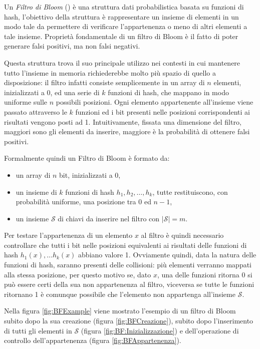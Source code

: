 \documentclass[../../main.tex]{subfiles}
\begin{document}
Un \textit{Filtro di Bloom} (\cite{Bloom1970SpacetimeTI}) è una struttura dati probabilistica basata su funzioni di hash, l'obiettivo della struttura è rappresentare un insieme di elementi in un modo tale da permettere di verificare l'appartenenza o meno di altri elementi a tale insieme. Proprietà fondamentale di un filtro di Bloom è il fatto di poter generare falsi positivi, ma non falsi negativi.

Questa struttura trova il suo principale utilizzo nei contesti in cui mantenere tutto l'insieme in memoria richiederebbe molto più spazio di quello a disposizione: il filtro infatti consiste semplicemente in un array di $n$ elementi, inizializzati a $0$, ed una serie di $k$ funzioni di hash, che mappano in modo uniforme sulle $n$ possibili posizioni. Ogni elemento appartenente all'insieme viene passato attraverso le $k$ funzioni ed i bit presenti nelle posizioni corrispondenti ai risultati vengono posti ad 1. Intuitivamente, fissata una dimensione del filtro, maggiori sono gli elementi da inserire, maggiore è la probabilità di ottenere falsi positivi.

Formalmente quindi un Filtro di Bloom è formato da:
    \begin{itemize}
        \item un array di $n$ bit, inizializzati a 0,
        \item un insieme di $k$ funzioni di hash $h_1, h_2, \dots, h_k$, tutte restituiscono, con probabilità uniforme, una posizione tra $0$ ed $n-1$,
        \item un insieme $\mathcal{S}$ di chiavi da inserire nel filtro con $|\mathcal{S}| = m$.
    \end{itemize}
Per testare l'appartenenza di un elemento $x$ al filtro è quindi necessario controllare che tutti i bit nelle posizioni equivalenti ai risultati delle funzioni di hash $h_1(x), \dots h_k(x)$ abbiano valore 1. Ovviamente quindi, data la natura delle funzioni di hash, saranno presenti delle collisioni: più elementi verranno mappati alla stessa posizione, per questo motivo se, dato $x$, una delle funzioni ritorna 0 si può essere certi della sua non appartenenza al filtro, viceversa se tutte le funzioni ritornano 1 è comunque possibile che l'elemento non appartenga all'insieme $\mathcal{S}$.

Nella figura \ref{fig:BFExample} viene mostrato l'esempio di un filtro di Bloom subito dopo la sua creazione (figura \ref{fig:BFCreazione}), subito dopo l'inserimento di tutti gli elementi in $\mathcal{S}$ (figura \ref{fig:BF:Inizializzazione}) e dell'operazione di controllo dell'appartenenza (figura \ref{fig:BFAppartenenza}).
\end{document}
